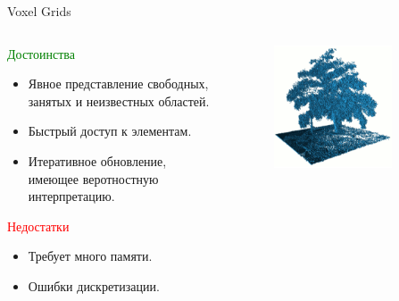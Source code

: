 \documentclass[9pt]{beamer}
\begin{document}
\begin{frame}{Voxel Grids}
\begin{columns}
\begin{column}{0.50\textwidth}
  \begin{block}{\textcolor{green}{Достоинства}}
    \begin{itemize}
    \item
    { 
      Явное представление свободных, занятых и неизвестных областей.
    }
    \item
    {
      Быстрый доступ к элементам.
    }
    \item
    {
      Итеративное обновление, имеющее веротностную интерпретацию.
    }
    \end{itemize}
  \end{block}

  \begin{block}{\textcolor{red}{Недостатки}}
    \begin{itemize}
    \item
    { 
      Требует много памяти.
    }
    \item
    {
      Ошибки дискретизации.
    }
    \end{itemize}
  \end{block}
\end{column}
\begin{column}{0.50\textwidth}
\begin{figure}[h]
    \centering
    \includegraphics[width=0.8\textwidth]{octomap_tree.png}
\end{figure}
\end{column}
\end{columns}
\end{frame}
\end{document}
